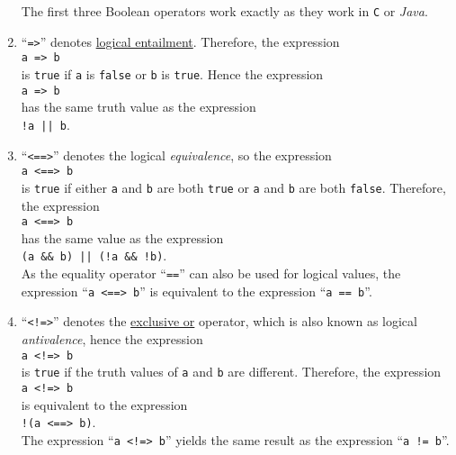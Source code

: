 \begin{enumerate}
      The first three Boolean operators work exactly as they work in \texttt{C} or \textsl{Java}.
\item ``\texttt{=>}'' denotes \href{https://en.wikipedia.org/wiki/Logical_consequence}{logical entailment}.
      Therefore, the expression
      \\[0.2cm]
      \hspace*{1.3cm}
      \texttt{a => b}
      \\[0.2cm]
      is \texttt{true} if \texttt{a} is \texttt{false} or \texttt{b} is \texttt{true}. Hence the expression 
      \\[0.2cm]
      \hspace*{1.3cm}
      \texttt{a => b}
      \\[0.2cm]
      has the same truth value as the expression
      \\[0.2cm]
      \hspace*{1.3cm}
      \texttt{!a || b}.
\item ``\texttt{<==>}'' denotes the logical \emph{equivalence},
      so the expression
      \\[0.2cm]
      \hspace*{1.3cm}
      \texttt{a <==> b}
      \\[0.2cm]
      is \texttt{true} if either  \texttt{a} and \texttt{b} are both \texttt{true} or \texttt{a} and
      \texttt{b} are both \texttt{false}. Therefore,  the expression 
      \\[0.2cm]
      \hspace*{1.3cm}
      \texttt{a <==> b}
      \\[0.2cm]
      has the same value as the expression
      \\[0.2cm]
      \hspace*{1.3cm}
      \texttt{(a \&\& b) || (!a \&\& !b)}.
      \\[0.2cm]
      As the equality operator ``\texttt{==}'' can also be used for logical values, the expression
      ``\texttt{a <==> b}'' is equivalent to the expression ``\texttt{a == b}''.
\item ``\texttt{<!=>}'' denotes the \href{https://en.wikipedia.org/wiki/Exclusive_or}{exclusive or} operator,  
      which is also known as logical \emph{antivalence},  hence the expression
      \\[0.2cm]
      \hspace*{1.3cm}
      \texttt{a <!=> b}
      \\[0.2cm]
      is \texttt{true} if the truth values of \texttt{a} and \texttt{b} are different.  Therefore,  the expression 
      \\[0.2cm]
      \hspace*{1.3cm}
      \texttt{a <!=> b}
      \\[0.2cm]
      is equivalent to the expression
      \\[0.2cm]
      \hspace*{1.3cm}
      \texttt{!(a <==> b)}.
      \\[0.2cm]
      The expression ``\texttt{a <!=> b}'' yields the same result as the expression ``\texttt{a != b}''.
\end{enumerate}
